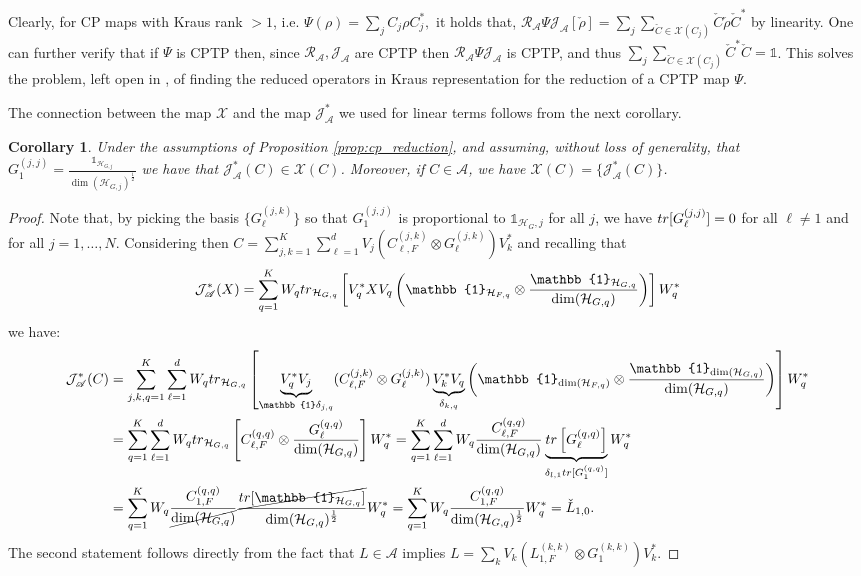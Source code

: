 \documentclass[aihp,12pt]{imsart}
\newcommand{\Hc}{\mathcal{H}}
\newcommand{\Jc}{\mathcal{J}}
\newcommand{\Rc}{\mathcal{R}}
\newcommand{\Xc}{\mathcal{X}}
\newcommand{\As}{\mathscr{A}}
\newcommand{\um}{\frac{1}{2}}
\newcommand{\one}{\mathbb{1}}
\newcommand{\tr}{{\rm tr}}
\theoremstyle{theorem}
\newtheorem{corollary}{Corollary}
\theoremstyle{definition}
\theoremstyle{remark}
\begin{document}
Clearly, for CP maps with Kraus rank $>1$, i.e. $\Psi(\rho) = \sum_j C_j\rho C_j^*,$ it holds that,  $\Rc_\As \Psi \Jc_\As[\check{\rho}] = \sum_j \sum_{\check{C}\in\Xc(C_j)} \check{C} \check{\rho} \check{C}^*$ by linearity. One can further verify that if $\Psi$ is CPTP then, since $\Rc_\As,\Jc_\As$ are CPTP then $\Rc_\As \Psi \Jc_\As$ is CPTP, and thus $\sum_j \sum_{\check{C}\in\Xc(C_j)} \check{C}^*\check{C} = \one$. This solves the problem, left open in \cite{tit2023}, of finding the reduced operators in Kraus representation for the reduction of a CPTP map $\Psi$.

The connection between the map $\Xc$ and the map $\Jc_\As^*$ we used for linear terms follows from the next corollary.
\begin{corollary}
\label{cor:reduced_operators}
    Under the assumptions of Proposition \ref{prop:cp_reduction}, and assuming, without loss of generality, that $G_{1}^{(j,j)} = \frac{\one_{\Hc_{G,j}}}{\dim(\Hc_{G,j})^\um}$ we have that $\Jc_{\As}^*(C)\in\Xc(C)$. Moreover, if $C\in\As$, we have $\Xc(C) = \{\Jc_\As^*(C)\}$.
\end{corollary}
\begin{proof}
Note that, by picking the basis $\{G_\ell^{(j,k)}\}$ so that $G_1^{(j,j)}$ is proportional to $\one_{\Hc_G,j}$ for all $j$, we have $\tr[G_\ell^{(j,j)}] = 0$ for all $\ell\neq1$ and for all $j=1,\dots,N$. Considering then $C =\sum_{j,k=1}^K\sum_{\ell=1}^d V_j (C_{\ell,F}^{(j,k)}\otimes G_{\ell}^{(j,k)}) V_k^*$ and recalling that \[\Jc_\As^*(X) = \sum_{q=1}^K W_q \tr_{\Hc_{G,q}}\left[V_q^* X V_q \left(\one_{\Hc_{F,q}}\otimes\frac{\one_{\Hc_{G,q}}}{\dim(\Hc_{G,q})}\right) \right]W_q^*\] we have:
\begin{align*}
    \Jc_\As^*(C) &= \sum_{j,k,q=1}^K \sum_{\ell=1}^d W_q \tr_{\Hc_{G,q}}\left[\underbrace{V_q^* V_j}_{\one\delta_{j,q}} (C_{\ell,F}^{(j,k)}\otimes G_{\ell}^{(j,k)}) \underbrace{V_k^* V_q}_{\delta_{k,q}} \left(\one_{\dim(\Hc_{F,q})}\otimes\frac{\one_{\dim(\Hc_{G,q})}}{\dim(\Hc_{G,q})}\right) \right]W_q^*\\
    &= \sum_{q=1}^K \sum_{\ell=1}^d W_q \tr_{\Hc_{G,q}}\left[C_{\ell,F}^{(q,q)} \otimes\frac{G_{\ell}^{(q,q)}}{\dim(\Hc_{G,q})} \right]W_q^*
    = \sum_{q=1}^K \sum_{\ell=1}^d W_q \frac{C_{\ell,F}^{(q,q)}} {\dim(\Hc_{G,q})}\underbrace{{\tr\left[G_{\ell}^{(q,q)}\right]}}_{\delta_{l,1} \tr[G_1^{(q,q)}]} W_q^*\\ 
    &= \sum_{q=1}^K W_q \frac{C_{1,F}^{(q,q)}}{\cancel{\dim(\Hc_{G,q})}} \frac{\cancel{\tr[\one_{\Hc_{G,q}}]}}{\dim(\Hc_{G,q})^\um} W_q^*
    = \sum_{q=1}^K W_q \frac{C_{1,F}^{(q,q)}}{\dim(\Hc_{G,q})^\um} W_q^* = \check{L}_{1,0}.
\end{align*}
The second statement follows directly from the fact that $L\in\As$ implies \(L =\sum_{k} V_k (L_{1,F}^{(k,k)}\otimes G_{1}^{(k,k)}) V_k^*.\)
\end{proof}
\end{document}
